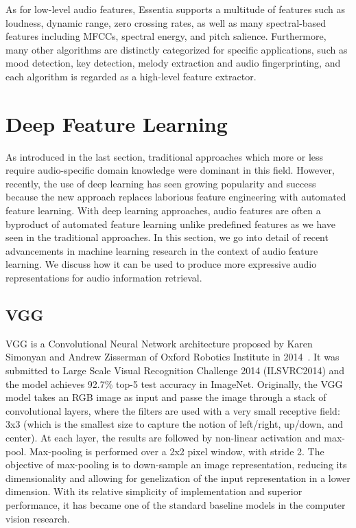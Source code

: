 As for low-level audio features, Essentia supports a multitude of features such as loudness, dynamic range, zero crossing rates, as well as many spectral-based features including MFCCs, spectral energy, and pitch salience. Furthermore, many other algorithms are distinctly categorized for specific applications, such as mood detection, key detection, melody extraction and audio fingerprinting, and each algorithm is regarded as a high-level feature extractor.

\section{Deep Feature Learning}

As introduced in the last section, traditional approaches which more or less require audio-specific domain knowledge were dominant in this field. However, recently, the use of deep learning has seen growing popularity and success because the new approach replaces laborious feature engineering with automated feature learning.
With deep learning approaches, audio features are often a byproduct of automated feature learning unlike predefined features as we have seen in the traditional approaches.  In this section, we go into detail of recent advancements in machine learning research in the context of audio feature learning. We discuss how it can be used to produce more expressive audio representations for audio information retrieval.


\subsection{VGG}
VGG is a Convolutional Neural Network architecture proposed by Karen Simonyan and Andrew Zisserman of Oxford Robotics Institute in 2014~\cite{simonyan2015}. It was submitted to Large Scale Visual Recognition Challenge 2014 (ILSVRC2014) and the model achieves 92.7\% top-5 test accuracy in ImageNet.
Originally, the VGG model takes an RGB image as input and passe the image through a stack of convolutional layers, where the filters are used with a very small receptive field: 3x3 (which is the smallest size to capture the notion of left/right, up/down, and center). At each layer, the results are followed by non-linear activation and max-pool. Max-pooling is performed over a 2x2 pixel window, with stride 2. The objective of max-pooling is to down-sample an image representation, reducing its dimensionality and allowing for genelization of the input representation in a lower dimension.
With its relative simplicity of implementation and superior performance, it has became one of the standard baseline models in the computer vision research.

